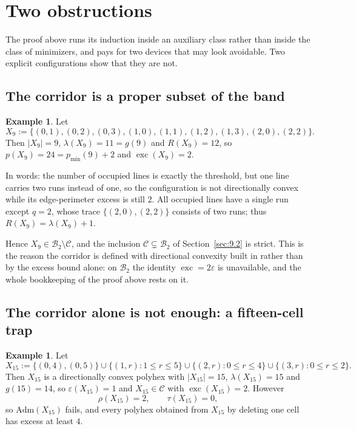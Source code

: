 \documentclass[11pt]{article}
\theoremstyle{plain}
\theoremstyle{definition}
\newtheorem{example}[theorem]{Example}
\theoremstyle{remark}
\newcommand{\sm}{\setminus}
\DeclareMathOperator{\exc}{exc}
\newcommand{\Adm}{\mathrm{Adm}}
\begin{document}
\section{Two obstructions}\label{sec:counter}

The proof above runs its induction inside an auxiliary class rather than inside the class of
minimizers, and pays for two devices that may look avoidable. Two explicit configurations
show that they are not.

\subsection{The corridor is a proper subset of the band}\label{sec:15.1}

\begin{example}\label{ex:9cell}
Let
\[
   X_{9}:=\{(0,1),(0,2),(0,3),(1,0),(1,1),(1,2),(1,3),(2,0),(2,2)\} .
\]
Then \(|X_{9}|=9\), \(\lambda(X_{9})=11=g(9)\) and \(R(X_{9})=12\), so
\(p(X_{9})=24=p_{\min}(9)+2\) and \(\exc(X_{9})=2\).
\end{example}

In words: the number of occupied lines is exactly the threshold, but one line carries two
runs instead of one, so the configuration is not directionally convex while its
edge-perimeter excess is still \(2\). All occupied lines have a single run except
\(q=2\), whose trace \(\{(2,0),(2,2)\}\) consists of two runs; thus
\(R(X_{9})=\lambda(X_{9})+1\).

Hence \(X_{9}\in\mathcal{B}_{2}\sm\mathcal{C}\), and the inclusion
\(\mathcal{C}\subsetneq\mathcal{B}_{2}\) of Section~\ref{sec:9.2} is strict. This is the
reason the corridor is defined with directional convexity built in rather than by the
excess bound alone: on \(\mathcal{B}_{2}\) the identity \(\exc=2\varepsilon\) is
unavailable, and the whole bookkeeping of the proof above rests on it.

\subsection{The corridor alone is not enough: a fifteen-cell trap}\label{sec:15.2}

\begin{example}\label{ex:15cell}
Let
\[
   X_{15}:=\{(0,4),(0,5)\}\cup\{(1,r):1\le r\le5\}\cup\{(2,r):0\le r\le4\}
   \cup\{(3,r):0\le r\le2\} .
\]
Then \(X_{15}\) is a directionally convex polyhex with \(|X_{15}|=15\),
\(\lambda(X_{15})=15\) and \(g(15)=14\), so \(\varepsilon(X_{15})=1\) and
\(X_{15}\in\mathcal{C}\) with \(\exc(X_{15})=2\). However
\[
   \rho(X_{15})=2,\qquad \tau(X_{15})=0,
\]
so \(\Adm(X_{15})\) fails, and every polyhex obtained from \(X_{15}\) by deleting one cell
has excess at least \(4\).
\end{example}
\end{document}
